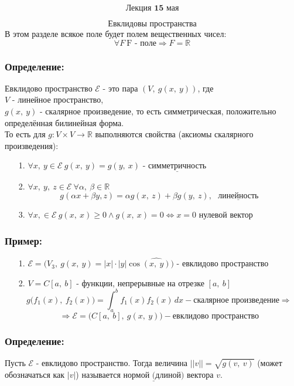 \documentclass[12pt, letterpaper, twoside]{article}
\newcommand{\Underl}[1]{$\underline{\text{#1}}$}
\newcommand{\mb}[1]{\mathbb{#1}}
\begin{document}
\[\textbf{Лекция 15 мая}\]

    \[\text{Евклидовы пространства}\]
    В этом разделе всякое поле будет полем вещественных чисел:
    \[\forall F\ \text{F - поле} \Rightarrow F = \mathbb{R}\]
    \subsubsection*{Определение:}
    Евклидово пространство $\mathcal{E}$ - это пара $(V,\ g(x,\ y))$, где\\
    $V$ - линейное пространство,\\
    $g(x,\ y)$ - скалярное произведение, то есть симметрическая, положительно определённая билинейная форма.\\
    То есть для $g: V\times V\to \mb{R}$ выполняются свойства (аксиомы скалярного произведения):
    \begin{enumerate}
        \item[1.] $\forall x,\ y\in\mathcal{E}\ g(x,\ y) = g(y,\ x)$ - \Underl{симметричность}
        \item[2.] $\forall x,\ y,\ z\in \mathcal{E}\ \forall \alpha,\ \beta\in \mb{R}$
        \[g(\alpha x + \beta y, z) = \alpha g(x,\ z) + \beta g(y,\ z),\text{ \Underl{линейность}}\]
        \item[3.] $\forall x,\in \mathcal{E}\ g(x,\ x)\geq 0 \wedge g(x,\ x) = 0\Leftrightarrow x = 0$ нулевой вектор 
    \end{enumerate}
    \subsubsection*{Пример:}
    \begin{enumerate}
        \item[1.] $\mathcal{E} = \Big(V_3,\ g(x,\ y) = |x|\cdot |y| \cos \widehat{(x,\ y)}\Big)$ - евклидово пространство
        \item[2.] $V = C[a,\ b]$ - функции, непрерывные на отрезке $[a,\ b]$
        \[g\big(f_1(x),\ f_2(x)\big) = \int_a^b f_1(x) f_2(x)\, dx - \text{скалярное произведение}\Rightarrow\]
        \[\Rightarrow \mathcal{E} = \Big(C[a,\ b],\ g(x,\ y)\Big) - \text{евклидово пространство}\]
    \end{enumerate}
    \subsubsection*{Определение:}
    Пусть $\mathcal{E}$ - евклидово пространство. Тогда величина $||v|| = \sqrt{g(v,\ v)}$ (может обозначаться как $|v|$) называется \Underl{нормой (длиной)} вектора $v$.
\end{document}
